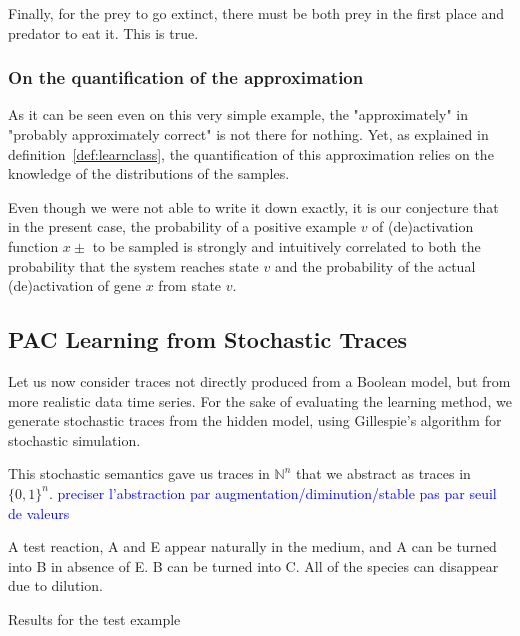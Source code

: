 \documentclass{llncs}
\newcommand{\francois}[1]{\textcolor{blue}{#1}}
\begin{document}
Finally, for the prey to go extinct, there must be both prey in the first place and predator to eat it. This is true.

\subsubsection{On the quantification of the approximation}

As it can be seen even on this very simple example, the "approximately" in "probably approximately correct" is not there for nothing. Yet, as explained in definition~\ref{def:learnclass}, the quantification of this approximation relies on the knowledge of the distributions of the samples.

Even though we were not able to write it down exactly, it is our conjecture that in the present case, the probability of a positive example $v$ of (de)activation function $x\pm$ to be sampled is strongly and intuitively correlated to both the probability that the system reaches state $v$ and the probability of the actual (de)activation of gene $x$ from state $v$. 



\subsection{PAC Learning from Stochastic Traces}

Let us now consider traces not directly produced from a Boolean model, but from more realistic data time series.
For the sake of evaluating the learning method,
we generate stochastic traces from the hidden model, using Gillespie's algorithm for stochastic simulation.

This stochastic semantics gave us traces in ${\mathbb{N}}^n$ that we abstract as traces in ${\{0,1\}}^n$.
\francois{preciser l'abstraction par augmentation/diminution/stable pas par seuil de valeurs} 

\begin{listfig}[hp]
	
	\vspace{-1em}
	\caption{A test reaction, A and E appear naturally in the medium, and A can be turned into B in absence of E. B  can be turned into C. All of the species can disappear due to dilution.\label{test}}
\end{listfig}
\begin{listfig}[hp]
	
	\vspace{-1em}
	\caption{Results for the test example\label{test_res}}
\end{listfig}
\end{document}

